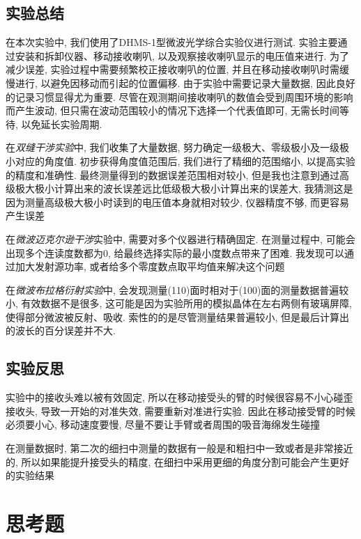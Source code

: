 \documentclass[zihao=5, UTF8]{article}
\theoremstyle{MyLineTheoremStyle} %
\theoremstyle{MyBlockTheoremStyle} %
\theoremstyle{MySubsubsectionStyle} %
\begin{document}
\subsection{实验总结}
在本次实验中, 我们使用了DHMS-1型微波光学综合实验仪进行测试. 实验主要通过安装和拆卸仪器、移动接收喇叭, 以及观察接收喇叭显示的电压值来进行. 为了减少误差, 实验过程中需要频繁校正接收喇叭的位置, 并且在移动接收喇叭时需缓慢进行, 以避免因移动而引起的位置偏移. 由于实验中需要记录大量数据, 因此良好的记录习惯显得尤为重要. 尽管在观测期间接收喇叭的数值会受到周围环境的影响而产生波动, 但只需在波动范围较小的情况下选择一个代表值即可, 无需长时间等待, 以免延长实验周期. 

在\textit{双缝干涉实验}中, 我们收集了大量数据, 努力确定一级极大、零级极小及一级极小对应的角度值. 初步获得角度值范围后, 我们进行了精细的范围缩小, 以提高实验的精度和准确性. 最终测量得到的数据误差范围相对较小, 但是我也注意到通过高级极大极小计算出来的波长误差远比低级极大极小计算出来的误差大, 我猜测这是因为测量高级极大极小时读到的电压值本身就相对较少, 仪器精度不够, 而更容易产生误差

在\textit{微波迈克尔逊干涉}实验中, 需要对多个仪器进行精确固定. 在测量过程中, 可能会出现多个连读度数都为$0$, 给最终选择实际的最小度数点带来了困难. 我发现可以通过加大发射源功率, 或者给多个零度数点取平均值来解决这个问题

在\textit{微波布拉格衍射实验}中, 会发现测量(110)面时相对于(100)面的测量数据普遍较小, 有效数据不是很多, 这可能是因为实验所用的模拟晶体在左右两侧有玻璃屏障, 使得部分微波被反射、吸收. 索性的的是尽管测量结果普遍较小, 但是最后计算出的波长的百分误差并不大.

\subsection{实验反思}
实验中的接收头难以被有效固定, 所以在移动接受头的臂的时候很容易不小心碰歪接收头, 导致一开始的对准失效, 需要重新对准进行实验. 因此在移动接受臂的时候必须要小心, 移动速度要慢, 尽量不要让手臂或者周围的吸音海绵发生碰撞

在测量数据时, 第二次的细扫中测量的数据有一般是和粗扫中一致或者是非常接近的, 所以如果能提升接受头的精度, 在细扫中采用更细的角度分割可能会产生更好的实验结果

\section{思考题}
\end{document}
